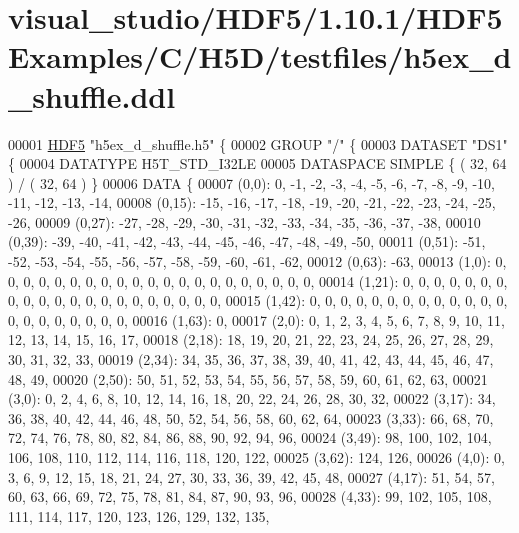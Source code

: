 \hypertarget{visual__studio_2_h_d_f5_21_810_81_2_h_d_f5_examples_2_c_2_h5_d_2testfiles_2h5ex__d__shuffle_8ddl_source}{}\section{visual\+\_\+studio/\+H\+D\+F5/1.10.1/\+H\+D\+F5\+Examples/\+C/\+H5\+D/testfiles/h5ex\+\_\+d\+\_\+shuffle.ddl}
\label{visual__studio_2_h_d_f5_21_810_81_2_h_d_f5_examples_2_c_2_h5_d_2testfiles_2h5ex__d__shuffle_8ddl_source}

\begin{DoxyCode}
00001 \hyperlink{namespace_h_d_f5}{HDF5} \textcolor{stringliteral}{"h5ex\_d\_shuffle.h5"} \{
00002 GROUP \textcolor{stringliteral}{"/"} \{
00003    DATASET \textcolor{stringliteral}{"DS1"} \{
00004       DATATYPE  H5T\_STD\_I32LE
00005       DATASPACE  SIMPLE \{ ( 32, 64 ) / ( 32, 64 ) \}
00006       DATA \{
00007       (0,0): 0, -1, -2, -3, -4, -5, -6, -7, -8, -9, -10, -11, -12, -13, -14,
00008       (0,15): -15, -16, -17, -18, -19, -20, -21, -22, -23, -24, -25, -26,
00009       (0,27): -27, -28, -29, -30, -31, -32, -33, -34, -35, -36, -37, -38,
00010       (0,39): -39, -40, -41, -42, -43, -44, -45, -46, -47, -48, -49, -50,
00011       (0,51): -51, -52, -53, -54, -55, -56, -57, -58, -59, -60, -61, -62,
00012       (0,63): -63,
00013       (1,0): 0, 0, 0, 0, 0, 0, 0, 0, 0, 0, 0, 0, 0, 0, 0, 0, 0, 0, 0, 0, 0,
00014       (1,21): 0, 0, 0, 0, 0, 0, 0, 0, 0, 0, 0, 0, 0, 0, 0, 0, 0, 0, 0, 0, 0,
00015       (1,42): 0, 0, 0, 0, 0, 0, 0, 0, 0, 0, 0, 0, 0, 0, 0, 0, 0, 0, 0, 0, 0,
00016       (1,63): 0,
00017       (2,0): 0, 1, 2, 3, 4, 5, 6, 7, 8, 9, 10, 11, 12, 13, 14, 15, 16, 17,
00018       (2,18): 18, 19, 20, 21, 22, 23, 24, 25, 26, 27, 28, 29, 30, 31, 32, 33,
00019       (2,34): 34, 35, 36, 37, 38, 39, 40, 41, 42, 43, 44, 45, 46, 47, 48, 49,
00020       (2,50): 50, 51, 52, 53, 54, 55, 56, 57, 58, 59, 60, 61, 62, 63,
00021       (3,0): 0, 2, 4, 6, 8, 10, 12, 14, 16, 18, 20, 22, 24, 26, 28, 30, 32,
00022       (3,17): 34, 36, 38, 40, 42, 44, 46, 48, 50, 52, 54, 56, 58, 60, 62, 64,
00023       (3,33): 66, 68, 70, 72, 74, 76, 78, 80, 82, 84, 86, 88, 90, 92, 94, 96,
00024       (3,49): 98, 100, 102, 104, 106, 108, 110, 112, 114, 116, 118, 120, 122,
00025       (3,62): 124, 126,
00026       (4,0): 0, 3, 6, 9, 12, 15, 18, 21, 24, 27, 30, 33, 36, 39, 42, 45, 48,
00027       (4,17): 51, 54, 57, 60, 63, 66, 69, 72, 75, 78, 81, 84, 87, 90, 93, 96,
00028       (4,33): 99, 102, 105, 108, 111, 114, 117, 120, 123, 126, 129, 132, 135,

\end{DoxyCode}
